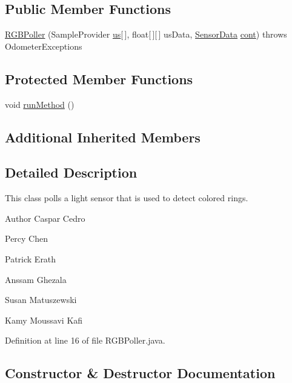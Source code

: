 \subsection*{Public Member Functions}
\begin{DoxyCompactItemize}
\item 
\hyperlink{classca_1_1mcgill_1_1ecse211_1_1threads_1_1_r_g_b_poller_a7e23e2fe527b2ecbf4ddc8f988dd70a5}{R\+G\+B\+Poller} (Sample\+Provider \hyperlink{classca_1_1mcgill_1_1ecse211_1_1threads_1_1_light_poller_ab6a9cb770bbf71f586697633db1475ff}{us}\mbox{[}$\,$\mbox{]}, float\mbox{[}$\,$\mbox{]}\mbox{[}$\,$\mbox{]} us\+Data, \hyperlink{classca_1_1mcgill_1_1ecse211_1_1threads_1_1_sensor_data}{Sensor\+Data} \hyperlink{classca_1_1mcgill_1_1ecse211_1_1threads_1_1_light_poller_ab6a9050ced4f6940add4735c8872194a}{cont})  throws Odometer\+Exceptions 
\end{DoxyCompactItemize}
\subsection*{Protected Member Functions}
\begin{DoxyCompactItemize}
\item 
void \hyperlink{classca_1_1mcgill_1_1ecse211_1_1threads_1_1_r_g_b_poller_a96db4561c87136de5098497fe30356fe}{run\+Method} ()
\end{DoxyCompactItemize}
\subsection*{Additional Inherited Members}


\subsection{Detailed Description}
This class polls a light sensor that is used to detect colored rings.

\begin{DoxyAuthor}{Author}
Caspar Cedro 

Percy Chen 

Patrick Erath 

Anssam Ghezala 

Susan Matuszewski 

Kamy Moussavi Kafi 
\end{DoxyAuthor}


Definition at line 16 of file R\+G\+B\+Poller.\+java.



\subsection{Constructor \& Destructor Documentation}
\mbox{\label{classca_1_1mcgill_1_1ecse211_1_1threads_1_1_r_g_b_poller_a7e23e2fe527b2ecbf4ddc8f988dd70a5}} 
